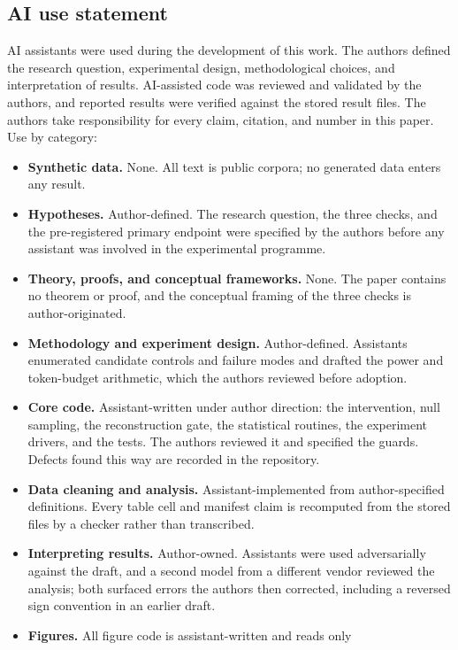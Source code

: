 \documentclass{article} %
\begin{document}
\subsection*{AI use statement}

AI assistants were used during the development of this work. The authors
defined the research question, experimental design, methodological choices, and
interpretation of results. AI-assisted code was reviewed and validated by the
authors, and reported results were verified against the stored result files.
The authors take responsibility for every claim, citation, and number in this
paper. Use by category:

\begin{itemize}
\setlength{\itemsep}{2pt}
\item \textbf{Synthetic data.} None. All text is public corpora; no generated
data enters any result.
\item \textbf{Hypotheses.} Author-defined. The research question, the
three checks, and the pre-registered primary endpoint were specified by the
authors before any assistant was involved in the experimental programme.
\item \textbf{Theory, proofs, and conceptual frameworks.} None. The paper
contains no theorem or proof, and the conceptual framing of the three checks
is author-originated.
\item \textbf{Methodology and experiment design.} Author-defined. Assistants
enumerated candidate controls and failure modes and drafted the power and
token-budget arithmetic, which the authors reviewed before adoption.
\item \textbf{Core code.} Assistant-written under author direction: the
intervention, null sampling, the reconstruction gate, the statistical
routines, the experiment drivers, and the tests. The authors reviewed it and
specified the guards. Defects found this way are recorded in the repository.
\item \textbf{Data cleaning and analysis.} Assistant-implemented from
author-specified definitions. Every table cell and manifest claim is
recomputed from the stored files by a checker rather than transcribed.
\item \textbf{Interpreting results.} Author-owned. Assistants were used
adversarially against the draft, and a second model from a different vendor
reviewed the analysis; both surfaced errors the authors then corrected,
including a reversed sign convention in an earlier draft.
\item \textbf{Figures.} All figure code is assistant-written and reads only

\end{itemize}
\end{document}
